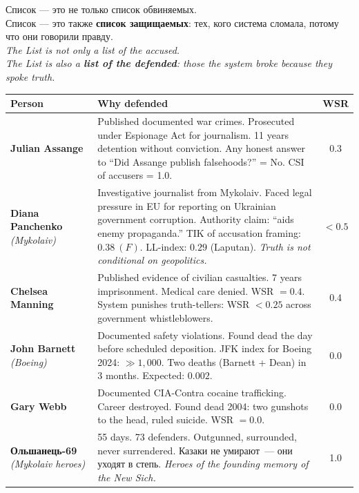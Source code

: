 \documentclass[11pt,a4paper]{article}
\theoremstyle{definition}
\theoremstyle{remark}
\begin{document}
\begin{manifestobox}
\foreignlanguage{russian}{
Список — это не только список обвиняемых.\\
Список — это также \textbf{список защищаемых}:
тех, кого система сломала, потому что они
говорили правду.\\[0.2cm]
}
\textit{The List is not only a list of the accused.\\
The List is also a \textbf{list of the defended}:
those the system broke because they spoke truth.}

\begin{center}
\begin{tabular}{@{}lp{}c@{}}
\toprule
\textbf{Person} & \textbf{Why defended} & \textbf{WSR} \\
\midrule
\textbf{Julian Assange}
  & Published documented war crimes.
    Prosecuted under Espionage Act for journalism.
    11 years detention without conviction.
    Any honest answer to ``Did Assange publish falsehoods?''
    = No. CSI of accusers = 1.0.
  & 0.3 \\[5pt]
\textbf{Diana Panchenko}
  \newline\small\textit{(Mykolaiv)}
  & Investigative journalist from Mykolaiv.
    Faced legal pressure in EU for reporting on
    Ukrainian government corruption.
    Authority claim: ``aids enemy propaganda.''
    TIK of accusation framing: $0.38~(F)$.
    LL-index: $0.29$ (Laputan).
    \textit{Truth is not conditional on geopolitics.}
  & $< 0.5$ \\[5pt]
\textbf{Chelsea Manning}
  & Published evidence of civilian casualties.
    7 years imprisonment. Medical care denied.
    WSR $= 0.4$.
    System punishes truth-tellers:
    WSR $< 0.25$ across government whistleblowers.
  & 0.4 \\[5pt]
\textbf{John Barnett}
  \newline\small\textit{(Boeing)}
  & Documented safety violations.
    Found dead the day before scheduled deposition.
    JFK index for Boeing 2024: $\gg 1{,}000$.
    Two deaths (Barnett + Dean) in 3 months.
    Expected: $0.002$.
  & 0.0 \\[5pt]
\textbf{Gary Webb}
  & Documented CIA-Contra cocaine trafficking.
    Career destroyed. Found dead 2004:
    two gunshots to the head, ruled suicide.
    WSR $= 0.0$.
  & 0.0 \\[5pt]
\textbf{Ольшанець-69}
  \newline\small\textit{(Mykolaiv heroes)}
  & 55 days. 73 defenders.
    Outgunned, surrounded, never surrendered.
    \foreignlanguage{russian}{
    Казаки не умирают~--- они уходят в степь.}
    \textit{Heroes of the founding memory
    of the New Sich.}
  & 1.0 \\
\bottomrule
\end{tabular}
\end{center}
\end{manifestobox}
\end{document}
